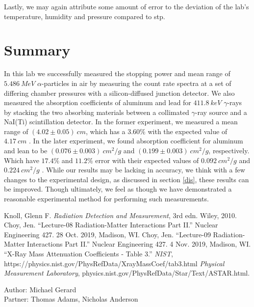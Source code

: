 \documentclass[10pt]{article}
\begin{document}
\begin{multicols}{2}
Lastly, we may again attribute some amount of error to the deviation of the lab's temperature, humidity and pressure compared to stp.

\section{Summary}

In this lab we successfully measured the stopping power and mean range of $5.486 \ MeV$ $\alpha$-particles in air by measuring the count rate spectra at a set of differing chamber pressures with a silicon-diffused junction detector.  We also measured the absorption coefficients of aluminum and lead for $411.8 \ keV$ $\gamma$-rays by stacking the two absorbing materials between a collimated $\gamma$-ray source and a NaI(Ti) scintillation detector.  In the former experiment, we measured a mean range of $(4.02 \pm 0.05) \ cm$, which has a $3.60 \%$ with the expected value of $4.17 \ cm$ \cite{bib:5}.  In the later experiment, we found absorption coefficient for aluminum and lean to be $(0.076 \pm 0.003) \ cm^{2}/g$ and $(0.199 \pm 0.003) \ cm^{2}/g$, respectively.  Which have $17.4 \%$ and $11.2\%$ error with their expected values of $0.092 \ cm^{2}/g$ and $0.224 \ cm^{2}/g$ \cite{bib:4}.  While our results may be lacking in accuracy, we think with a few changes to the experimental design, as discussed in section \ref{dis}, these results can be improved.  Though ultimately, we feel as though we have demonstrated a reasonable experimental method for performing such measurements. 

\end{multicols}

\newpage

\begin{thebibliography}{99}
 Knoll, Glenn F. {\it Radiation Detection and Measurement}, 3rd edn. Wiley, 2010.
Choy, Jen. ``Lecture-08 Radiation-Matter Interactions Part II.'' Nuclear Engineering 427. 28 Oct. 2019, Madison, WI.
 Choy, Jen. ``Lecture-09 Radiation-Matter Interactions Part II.'' Nuclear Engineering 427. 4 Nov. 2019, Madison, WI.
 ``X-Ray Mass Attenuation Coefficients - Table 3.'' {\it NIST}, \\ https://physics.nist.gov/PhysRefData/XrayMassCoef/tab3.html
 {\it Physical Measurement Laboratory}, physics.nist.gov/PhysRefData/Star/Text/ASTAR.html.
\end{thebibliography}

\newpage

Author:  Michael Gerard \\

Partner: Thomas Adams, Nicholas Anderson
\end{document}
